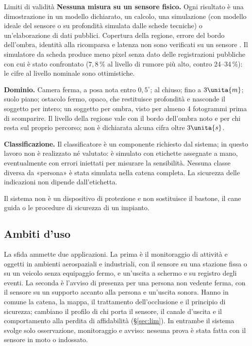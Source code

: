 \begin{riquadro}{Limiti di validità}
\textbf{Nessuna misura su un sensore fisico.} Ogni risultato è una dimostrazione in un modello dichiarato, un calcolo, una simulazione (con modello ideale del sensore o su profondità simulata dalle schede tecniche) o un'elaborazione di dati pubblici. Copertura della regione, errore del bordo dell'ombra, identità alla ricomparsa e latenza non sono verificati su un sensore . Il simulatore da scheda produce meno pixel senza dato delle registrazioni pubbliche con cui è stato confrontato ($7{,}8\,\%$ al livello di rumore più alto, contro 24--34\,\%): le cifre al livello nominale sono ottimistiche.

\textbf{Dominio.} Camera ferma, a posa nota entro $0{,}5^\circ$; al chiuso; fino a $3\unita{m}$; suolo piano; ostacolo fermo, opaco, che restituisce profondità e nasconde il soggetto per intero; un soggetto per ombra, visto per almeno 4 fotogrammi prima di scomparire. Il livello della regione vale con il bordo dell'ombra noto e per chi resta sul proprio percorso; non è dichiarata alcuna cifra oltre $3\unita{s}$.

\textbf{Classificazione.} Il classificatore è un componente richiesto dal sistema; in questo lavoro non è realizzato né valutato: è simulato con etichette assegnate a mano, eventualmente con errori iniettati per misurare la sensibilità. Nessuna classe diversa da «persona» è stata simulata nella catena completa. La sicurezza delle indicazioni non dipende dall'etichetta.

Il sistema non è un dispositivo di protezione e non sostituisce il bastone, il cane guida o le procedure di sicurezza di un impianto.
\end{riquadro}

\subsection{Ambiti d'uso}\label{sec:intro-ambiti}

La sfida ammette due applicazioni. La prima è il monitoraggio di attività e oggetti in ambienti aerospaziali e industriali, con il sensore su una stazione fissa o su un veicolo senza equipaggio fermo, e un'uscita a schermo e su registro degli eventi. La seconda è l'avviso di presenza per una persona non vedente ferma, con il sensore su un supporto accanto alla persona e un'uscita sonora. Hanno in comune la catena, la mappa, il trattamento dell'occlusione e il principio di sicurezza; cambiano il profilo di chi porta il sensore, il canale d'uscita e il comportamento alla perdita di affidabilità (\S\ref{sec:lim}). In entrambe il sistema svolge solo osservazione, monitoraggio e avviso: nessuna prova è stata fatta con il sensore in moto o indossato.

